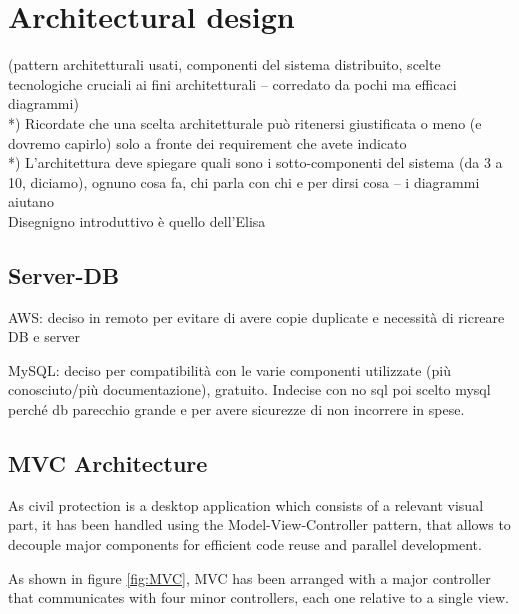 \documentclass[a4paper,12pt]{report}
\begin{document}
\chapter{Architectural design}

(pattern architetturali usati, componenti del sistema distribuito, scelte tecnologiche cruciali ai fini architetturali -- corredato da pochi ma efficaci diagrammi)\\

*) Ricordate che una scelta architetturale può ritenersi giustificata o meno (e dovremo capirlo) solo a fronte dei requirement che avete indicato\\

*) L'architettura deve spiegare quali sono i sotto-componenti del sistema (da 3 a 10, diciamo), ognuno cosa fa, chi parla con chi e per dirsi cosa -- i diagrammi aiutano\\

Disegnigno introduttivo è quello dell'Elisa

\section{Server-DB}
AWS: deciso in remoto per evitare di avere copie duplicate e necessità di ricreare DB e server

MySQL: deciso per compatibilità con le varie componenti utilizzate (più conosciuto/più documentazione), gratuito.
Indecise con no sql poi scelto mysql perché db parecchio grande e per avere sicurezze di non incorrere in spese.

\section{MVC Architecture}
As civil protection is a desktop application which consists of a relevant visual part, it has been handled using the Model-View-Controller pattern, that allows to decouple major components for efficient code reuse and parallel development.

As shown in figure \ref{fig:MVC}, MVC has been arranged with a major controller that communicates with four minor controllers, each one relative to a single view.
\end{document}
